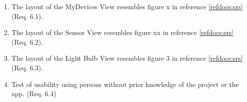 \documentclass[a4paper]{article}
\newlength{\testlabellength}
\newenvironment{testlist}{\begin{enumerate}[label=\bfseries Test \thesubsection.\arabic* , labelindent=0pt, labelwidth=\testlabellength , leftmargin=2cm]}{\end{enumerate}}
\begin{document}
\begin{appendices}
\begin{testlist}
	\item The layout of the MyDevices View resembles figure x in reference \ref{refdocs:srs} (Req. 6.1).
	
	\item The layout of the Sensor View resembles figure xx in reference \ref{refdocs:srs} (Req. 6.2).
	\item The layout of the Light Bulb View resembles figure 3 in reference \ref{refdocs:srs} (Req. 6.3).
	
	\item Test of usability using persons without prior knowledge of the project or the app. (Req. 6.4)
\end{testlist}

\end{appendices}
\end{document}
